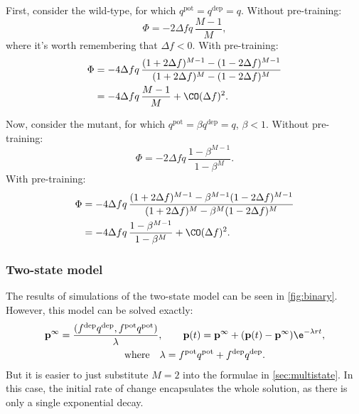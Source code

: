 \documentclass[12pt]{article}
\newcommand{\pr}{\mathbf{p}}
\newcommand{\eq}{\pr^\infty}
\newcommand{\pot}{^{\text{pot}}}
\newcommand{\dep}{^{\text{dep}}}
\begin{document}
First, consider the wild-type, for which $q\pot=q\dep=q$.
Without pre-training:
%
\begin{equation}\label{eq:multiLinWTnopre}
  \Phi = -2\Delta fq\,\frac{M-1}{M},
\end{equation}
%
where it's worth remembering that $\Delta f<0$.
With pre-training:
%
\begin{equation}\label{eq:multiLinWTpre}
\begin{aligned}
  \Phi &= -4\Delta f q \, \frac{(1+2\Delta f)^{M-1} - (1-2\Delta f)^{M-1}}
          {(1+2\Delta f)^M - (1-2\Delta f)^M} \\
       &= -{4\Delta f q}\,\frac{M-1}{M} + \CO(\Delta f)^2.
\end{aligned}
\end{equation}
%

Now, consider the mutant, for which $q\pot=\beta q\dep=q$, $\beta<1$.
Without pre-training:
%
\begin{equation}\label{eq:multiLinKOnopre}
  \Phi = -2\Delta f q\,\frac{1-\beta^{M-1}}{1-\beta^M}.
\end{equation}
%
With pre-training:
%
\begin{equation}\label{eq:multiLinKOpre}
\begin{aligned}
  \Phi &= -4\Delta f q \, \frac{(1+2\Delta f)^{M-1} - \beta^{M-1}(1-2\Delta f)^{M-1}}
          {(1+2\Delta f)^M - \beta^M(1-2\Delta f)^M} \\
       &= -4\Delta f q\,\frac{1-\beta^{M-1}}{1-\beta^M} + \CO(\Delta f)^2.
\end{aligned}
\end{equation}
%





\subsubsection{Two-state model}\label{sec:binary}




The results of simulations of the two-state model can be seen in \autoref{fig:binary}.
However, this model can be solved exactly:
%
\begin{multline}\label{eq:binarysol}
  \eq = \frac{(f\dep q\dep, f\pot q\pot)}{\lambda},
  \qquad
  \pr(t) = \eq + (\pr(t)-\eq)\e^{-\lambda rt},\\
  \qquad \text{where} \quad
  \lambda = f\pot q\pot + f\dep q\dep.
\end{multline}
%
But it is easier to just substitute $M=2$ into the formulae in \autoref{sec:multistate}.
In this case, the initial rate of change encapsulates the whole solution, as there is only a single exponential decay.
\end{document}
